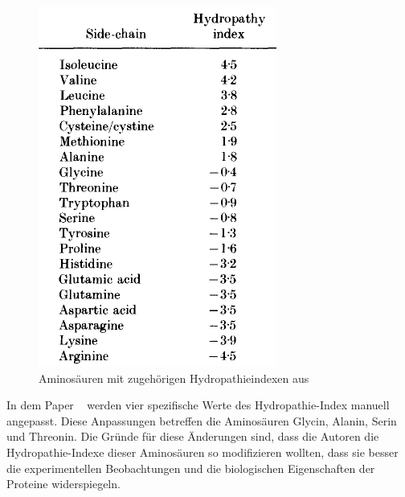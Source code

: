 \documentclass[german,version-2022-01]{uzl-thesis}
\begin{document}
\begin{figure}[tbp]
  \centering
  \includegraphics[scale=0.75]{Images/Hydropathy_scores_Paper.png}
  \caption{Aminos\"auren mit zugeh\"origen Hydropathieindexen aus  \cite{kyte_simple_1982}}
  \label{fig:Hydropathieindexe}
\end{figure}
In dem Paper ~\cite{kyte_simple_1982} werden vier spezifische Werte des Hydropathie-Index manuell angepasst. Diese Anpassungen betreffen die Aminos\"auren Glycin, Alanin, Serin und Threonin. Die Gr\"unde f\"ur diese \"Anderungen sind, dass die Autoren die Hydropathie-Indexe dieser Aminos\"auren so modifizieren wollten, dass sie besser die experimentellen Beobachtungen und die biologischen Eigenschaften der Proteine widerspiegeln.
\end{document}
